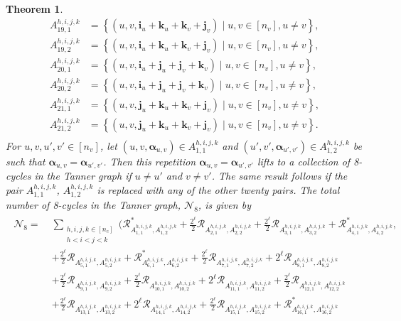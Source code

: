 \documentclass[11pt]{article}
\newtheorem{theorem}[lemma]{Theorem}
\theoremstyle{plain}
\theoremstyle{plain}
\theoremstyle{definition}
\numberwithin{theo}{section}
\newcommand{\bi}{{\mathbf i}}
\newcommand{\bj}{{\mathbf j}}
\newcommand{\bk}{{\mathbf k}}
\newcommand{\balpha}{{\boldsymbol \alpha}}
\newcounter{alp}
\begin{document}
\begin{theorem}
\begin{align*}
A_{19,1}^{h,i,j,k} &= \left\{(u,v,\bi_u+\bk_u+\bk_v+\bj_v)\mid u,v\in[n_v], u\neq v\right\}, \\
A_{19,2}^{h,i,j,k} &= \left\{(u,v,\bi_u+\bk_u+\bk_v+\bj_v)\mid u,v\in[n_v], u\neq v\right\}, \\
A_{20,1}^{h,i,j,k} &= \left\{(u,v,\bi_u+\bj_u+\bj_v+\bk_v)\mid u,v\in[n_v], u\neq v\right\}, \\
A_{20,2}^{h,i,j,k} &= \left\{(u,v,\bi_u+\bj_u+\bj_v+\bk_v)\mid u,v\in[n_v], u\neq v\right\}, \\
A_{21,1}^{h,i,j,k} &= \left\{(u,v,\bj_u+\bk_u+\bk_v+\bj_v)\mid u,v\in[n_v], u\neq v\right\}, \\
A_{21,2}^{h,i,j,k} &= \left\{(u,v,\bj_u+\bk_u+\bk_v+\bj_v)\mid u,v\in[n_v], u\neq v\right\}. \\
\end{align*}
\noindent For $u,v,u',v'\in[n_v]$, let $(u,v,\balpha_{u,v})\in A_{1,1}^{h,i,j,k}$ and $(u',v',\balpha_{u',v'})\in A_{1,2}^{h,i,j,k}$ be such that $\balpha_{u,v}=\balpha_{u',v'}$. Then this repetition $\balpha_{u,v}=\balpha_{u',v'}$ lifts to a collection of 8-cycles in the Tanner graph if $u\neq u'$ and $v\neq v'$. The same result follows if the pair $A_{1,1}^{h,i,j,k}$, $A_{1,2}^{h,i,j,k}$ is replaced with any of the other twenty pairs. 
The total number of 8-cycles in the Tanner graph, $\mathcal{N}_8$, is given by 
\begin{align}
\begin{split}
\label{counting_cycles_formula_num8cycles_ncxnv_dyadics}
\mathcal{N}_8 = \; & \sum_{\substack{h,i,j,k\in[n_c]\\h<i<j<k}} \biggl( \mathcal{R}_{A_{1,1}^{h,i,j,k},A_{1,2}^{h,i,j,k}}^*+\frac{2^\ell}{2}\mathcal{R}_{A_{2,1}^{h,i,j,k},A_{2,2}^{h,i,j,k}}+\frac{2^\ell}{2}\mathcal{R}_{A_{3,1}^{h,i,j,k},A_{3,2}^{h,i,j,k}}+\mathcal{R}_{A_{4,1}^{h,i,j,k},A_{4,2}^{h,i,j,k}}^*, \\
& +\frac{2^\ell}{2}\mathcal{R}_{A_{5,1}^{h,i,j,k},A_{5,2}^{h,i,j,k}}+\mathcal{R}_{A_{6,1}^{h,i,j,k},A_{6,2}^{h,i,j,k}}^*+\frac{2^\ell}{2}\mathcal{R}_{A_{7,1}^{h,i,j,k},A_{7,2}^{h,i,j,k}}+2^\ell\mathcal{R}_{A_{8,1}^{h,i,j,k},A_{8,2}^{h,i,j,k}} \\
& +\frac{2^\ell}{2}\mathcal{R}_{A_{9,1}^{h,i,j,k},A_{9,2}^{h,i,j,k}}+\frac{2^\ell}{2}\mathcal{R}_{A_{10,1}^{h,i,j,k},A_{10,2}^{h,i,j,k}}+2^\ell\mathcal{R}_{A_{11,1}^{h,i,j,k},A_{11,2}^{h,i,j,k}}+\frac{2^\ell}{2}\mathcal{R}_{A_{12,1}^{h,i,j,k},A_{12,2}^{h,i,j,k}} \\
& +\frac{2^\ell}{2}\mathcal{R}_{A_{13,1}^{h,i,j,k},A_{13,2}^{h,i,j,k}}+2^\ell\mathcal{R}_{A_{14,1}^{h,i,j,k},A_{14,2}^{h,i,j,k}}+\frac{2^\ell}{2}\mathcal{R}_{A_{15,1}^{h,i,j,k},A_{15,2}^{h,i,j,k}}+\mathcal{R}_{A_{16,1}^{h,i,j,k},A_{16,2}^{h,i,j,k}}^* \\

\end{split}
\end{align}
\end{theorem}
\end{document}
